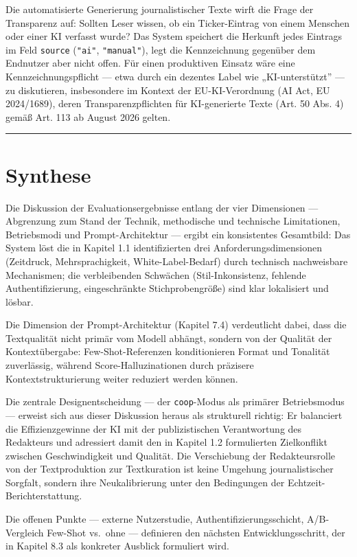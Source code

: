 Die automatisierte Generierung journalistischer Texte wirft die Frage
der Transparenz auf: Sollten Leser wissen, ob ein Ticker-Eintrag von
einem Menschen oder einer KI verfasst wurde? Das System speichert die
Herkunft jedes Eintrags im Feld \texttt{source} (\texttt{"ai"},
\texttt{"manual"}), legt die Kennzeichnung gegenüber dem Endnutzer aber
nicht offen. Für einen produktiven Einsatz wäre eine
Kennzeichnungspflicht --- etwa durch ein dezentes Label wie
„KI-unterstützt'' --- zu diskutieren, insbesondere im Kontext der
EU-KI-Verordnung (AI Act, EU 2024/1689), deren Transparenzpflichten für
KI-generierte Texte (Art. 50 Abs. 4) gemäß Art. 113 ab August 2026
gelten.

\begin{center}\rule{0.5\linewidth}{0.5pt}\end{center}

\section{Synthese}\label{synthese}

Die Diskussion der Evaluationsergebnisse entlang der vier Dimensionen
--- Abgrenzung zum Stand der Technik, methodische und technische
Limitationen, Betriebsmodi und Prompt-Architektur --- ergibt ein
konsistentes Gesamtbild: Das System löst die in Kapitel 1.1
identifizierten drei Anforderungsdimensionen (Zeitdruck, Mehrsprachigkeit,
White-Label-Bedarf) durch technisch nachweisbare Mechanismen; die
verbleibenden Schwächen (Stil-Inkonsistenz, fehlende Authentifizierung,
eingeschränkte Stichprobengröße) sind klar lokalisiert und lösbar.

Die Dimension der Prompt-Architektur (Kapitel 7.4) verdeutlicht dabei,
dass die Textqualität nicht primär vom Modell abhängt, sondern von der
Qualität der Kontextübergabe: Few-Shot-Referenzen konditionieren Format
und Tonalität zuverlässig, während Score-Halluzinationen durch präzisere
Kontextstrukturierung weiter reduziert werden können.

Die zentrale Designentscheidung --- der \texttt{coop}-Modus als primärer
Betriebsmodus --- erweist sich aus dieser Diskussion heraus als
strukturell richtig: Er balanciert die Effizienzgewinne der KI mit der
publizistischen Verantwortung des Redakteurs und adressiert damit den in
Kapitel 1.2 formulierten Zielkonflikt zwischen Geschwindigkeit und
Qualität. Die Verschiebung der Redakteursrolle von der Textproduktion
zur Textkuration ist keine Umgehung journalistischer Sorgfalt, sondern
ihre Neukalibrierung unter den Bedingungen der
Echtzeit-Berichterstattung.

Die offenen Punkte --- externe Nutzerstudie, Authentifizierungsschicht,
A/B-Vergleich Few-Shot vs.~ohne --- definieren den nächsten
Entwicklungsschritt, der in Kapitel 8.3 als konkreter Ausblick
formuliert wird.

